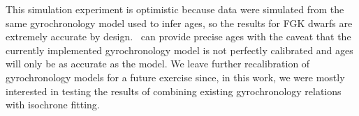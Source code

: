 

This simulation experiment is optimistic because data were simulated from the
same gyrochronology model used to infer ages, so the results for FGK dwarfs
are extremely accurate by design.
\sd\ can provide precise ages with the caveat that the currently implemented
gyrochronology model is not perfectly calibrated and ages will only be as
accurate as the model.
We leave further recalibration of gyrochronology models for a future exercise
since, in this work, we were mostly interested in testing the results of
combining existing gyrochronology relations with isochrone fitting.

